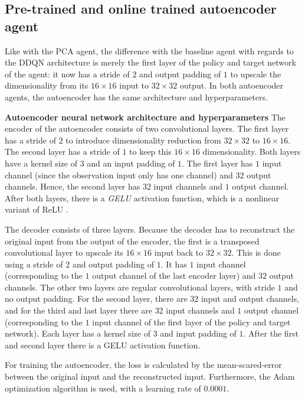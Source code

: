\subsection{Pre-trained and online trained autoencoder agent} %
Like with the PCA agent, the difference with the baseline agent with regards to the DDQN architecture is merely the first layer of the policy and target network of the agent: it now has a stride of $2$ and output padding of $1$ to upscale the dimensionality from its $16 \times 16$ input to $32 \times 32$ output. In both autoencoder agents, the autoencoder has the same architecture and hyperparameters. \newline

\noindent \textbf{Autoencoder neural network architecture and hyperparameters}
\noindent The encoder of the autoencoder consists of two convolutional layers. The first layer has a stride of $2$ to introduce dimensionality reduction from $32 \times 32$ to $16 \times 16$. The second layer has a stride of $1$ to keep this $16 \times 16$ dimensionality. Both layers have a kernel size of $3$ and an input padding of $1$. The first layer has $1$ input channel (since the observation input only has one channel) and $32$ output channels. Hence, the second layer has $32$ input channels and $1$ output channel. After both layers, there is a \emph{GELU} activation function, which is a nonlinear variant of ReLU \cite{gelu}.

The decoder consists of three layers. Because the decoder has to reconstruct the original input from the output of the encoder, the first is a transposed convolutional layer to upscale its $16 \times 16$ input back to $32 \times 32$. This is done using a stride of $2$ and output padding of $1$. It has $1$ input channel (corresponding to the $1$ output channel of the last encoder layer) and $32$ output channels. The other two layers are regular convolutional layers, with stride $1$ and no output padding. For the second layer, there are $32$ input and output channels, and for the third and last layer there are $32$ input channels and $1$ output channel (corresponding to the $1$ input channel of the first layer of the policy and target network). Each layer has a kernel size of $3$ and input padding of $1$. After the first and second layer there is a GELU activation function.

For training the autoencoder, the loss is calculated by the mean-scared-error between the original input and the reconstructed input. Furthermore, the Adam optimization algorithm is used, with a learning rate of $0.0001$. 


